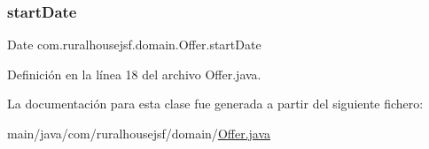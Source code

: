 \subsubsection{\texorpdfstring{startDate}{startDate}}
{\footnotesize\ttfamily Date com.\+ruralhousejsf.\+domain.\+Offer.\+start\+Date\hspace{0.3cm}{\ttfamily [private]}}



Definición en la línea 18 del archivo Offer.\+java.



La documentación para esta clase fue generada a partir del siguiente fichero\+:\begin{DoxyCompactItemize}
\item 
main/java/com/ruralhousejsf/domain/\mbox{\hyperlink{_offer_8java}{Offer.\+java}}\end{DoxyCompactItemize}
